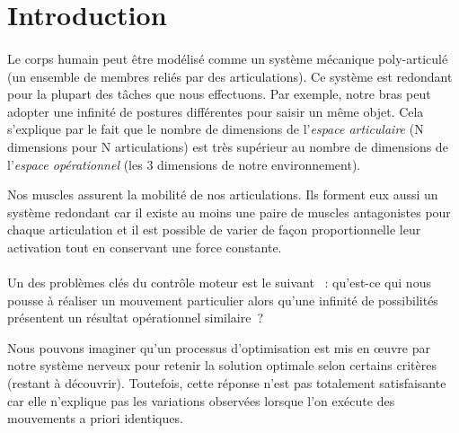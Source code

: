\documentclass[pdftex,a4paper,11pt]{article}
\begin{document}



\tableofcontents

\newpage




\section{Introduction}

\paragraph{}
Le corps humain peut être modélisé comme un système mécanique poly-articulé (un
ensemble de membres reliés par des articulations). Ce système est redondant
pour la plupart des tâches que nous effectuons. Par exemple, notre bras peut
adopter une infinité de postures différentes pour saisir un même objet. Cela
s'explique par le fait que le nombre de dimensions de l'{\em espace
articulaire} (N dimensions pour N articulations) est très supérieur au nombre
de dimensions de l'{\em espace opérationnel} (les 3 dimensions de notre
environnement).

Nos muscles assurent la mobilité de nos articulations. Ils forment eux aussi un
système redondant car il existe au moins une paire de muscles antagonistes pour
chaque articulation et il est possible de varier de façon proportionnelle leur
activation tout en conservant une force constante.

\paragraph{}
Un des problèmes clés du contrôle moteur est le suivant \cite{bernstein67}~:
qu'est-ce qui nous pousse à réaliser un mouvement particulier alors qu'une
infinité de possibilités présentent un résultat opérationnel similaire~?
 
Nous pouvons imaginer qu'un processus d'optimisation est mis en œuvre par notre
système nerveux pour retenir la solution \og{}optimale\fg{} selon certains
critères (restant à découvrir).
Toutefois, cette réponse n'est pas totalement satisfaisante car
elle n'explique pas les variations observées lorsque l'on exécute des
mouvements a priori identiques.
\end{document}
